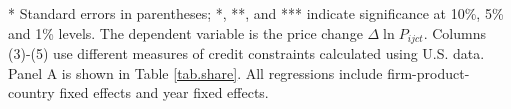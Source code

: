 \documentclass[12pt]{article}
\begin{document}
\begin{table}[htbp]
\begin{threeparttable}
\begin{tabular}{lccccc}
		\bottomrule
	    \end{tabular}
    \begin{tablenotes}
    	\footnotesize
    	\item[*] Standard errors in parentheses; *, **, and *** indicate significance at 10\%, 5\% and 1\% levels. The dependent variable is the price change $\Delta \ln P_{ijct}$. Columns (3)-(5) use different measures of credit constraints calculated using U.S. data. Panel A is shown in Table \ref{tab.share}. All regressions include firm-product-country fixed effects and year fixed effects.
    \end{tablenotes}
	\end{threeparttable}
	\label{tab.marketshare}
\end{table}
\end{document}
